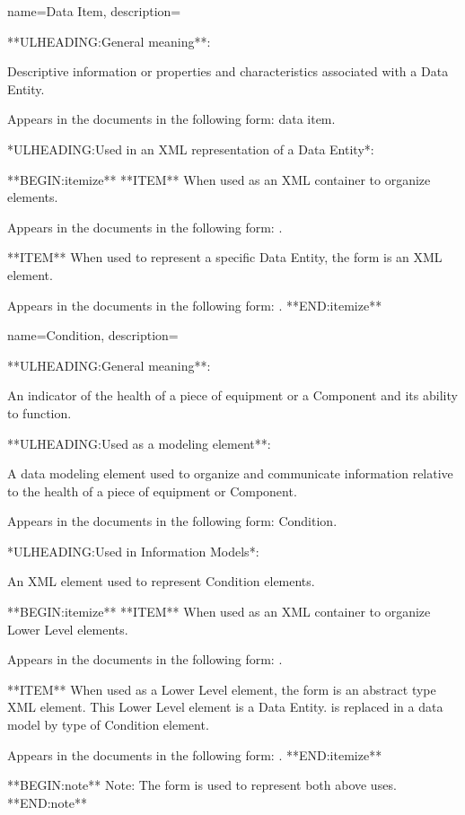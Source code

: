 {
    name={Data Item},
	description={
	**ULHEADING:General meaning**:

	Descriptive information or properties and characteristics associated with a \gls{Data Entity}.

	Appears in the documents in the following form: data item.

	*ULHEADING:Used in an XML representation of a \gls{Data Entity}*:

    **BEGIN:itemize**
	**ITEM** When used as an XML container to organize  elements.

	Appears in the documents in the following form: .

	**ITEM** When used to represent a specific \gls{Data Entity}, the form  is an XML element.  

	Appears in the documents in the following form: .
    **END:itemize**
}
}

{
    name={Condition},
	description={
	**ULHEADING:General meaning**:

	An indicator of the health of a piece of equipment or a \gls{Component} and its ability to function.

	**ULHEADING:Used as a modeling element**:

	A data modeling element used to organize and communicate information relative to the health of a piece of equipment or \gls{Component}.

	Appears in the documents in the following form: \gls{Condition}.

	*ULHEADING:Used in \gls{Information Models}*:

	An XML element used to represent \gls{Condition} elements.

    **BEGIN:itemize**
	**ITEM** When used as an XML container to organize \gls{Lower Level}  elements.

	Appears in the documents in the following form: .

	**ITEM** When used as a \gls{Lower Level} element, the form  is an abstract type XML element.  This \gls{Lower Level} element is a \gls{Data Entity}.   is replaced in a data model by type of \gls{Condition} element.

	Appears in the documents in the following form: .
	**END:itemize**

	**BEGIN:note**
	Note: The form  is used to represent both above uses.
	**END:note**
}
}


